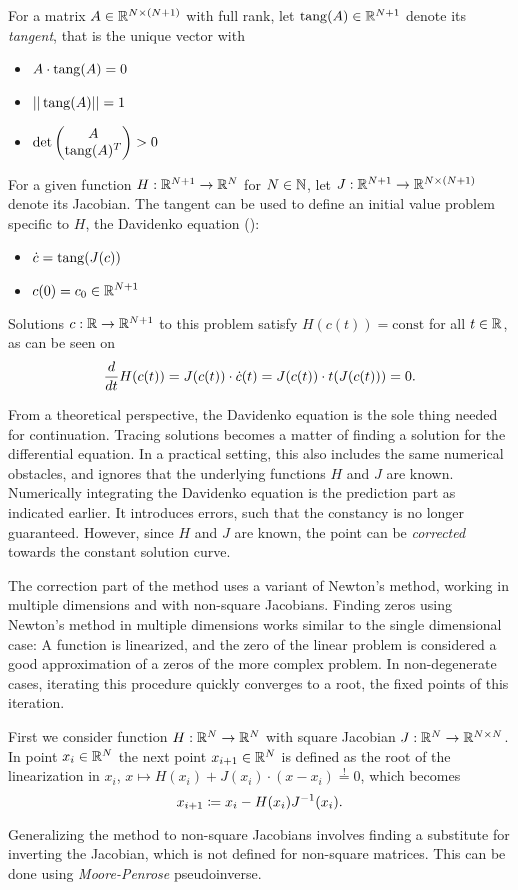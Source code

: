 For a matrix $A \in \mathbb{R}^{N \times (N+1)}$ with full rank, let $\operatorname{tang}(A) \in \mathbb{R}^{N+1}$ denote its \emph{tangent}, that is the unique vector with
	\begin{itemize}
		\item $\displaystyle A \cdot \operatorname{tang}(A) = 0$
		\item $\displaystyle ||\operatorname{tang}(A)|| = 1$
		\item $\displaystyle \det \begin{pmatrix}
			A\\
			\operatorname{tang}(A)^T
		\end{pmatrix} > 0$
	\end{itemize}
For a given function $H: \mathbb{R}^{N+1} \to \mathbb{R}^N$ for $N \in \mathbb{N}$, let $J: \mathbb{R}^{N+1} \to \mathbb{R}^{N \times (N+1)}$ denote its Jacobian.
The tangent can be used to define an initial value problem specific to $H$, the Davidenko equation (\cite{davidenko1953new}): %
	\begin{itemize}
		\item $\displaystyle \dot c = \operatorname{tang}(J(c))$ %
		\item $\displaystyle c(0) = c_0 \in \mathbb{R}^{N+1}$
	\end{itemize}
Solutions $c: \mathbb{R} \to \mathbb{R}^{N+1}$ to this problem satisfy $H(c(t)) = \text{const}$ for all $t \in \mathbb{R}$, as can be seen on
	\[
		\frac{d}{dt} H(c(t)) = J(c(t)) \cdot \dot c(t) = J(c(t)) \cdot t(J(c(t))) = 0 \text.
	\]

From a theoretical perspective, the Davidenko equation is the sole thing needed for continuation.
Tracing solutions becomes a matter of finding a solution for the differential equation.
In a practical setting, this also includes the same numerical obstacles, and ignores that the underlying functions $H$ and $J$ are known.
Numerically integrating the Davidenko equation is the prediction part as indicated earlier.
It introduces errors, such that the constancy is no longer guaranteed.
However, since $H$ and $J$ are known, the point can be \emph{corrected} towards the constant solution curve.

The correction part of the method uses a variant of Newton's method, working in multiple dimensions and with non-square Jacobians.
Finding zeros using Newton's method in multiple dimensions works similar to the single dimensional case: A function is linearized, and the zero of the linear problem is considered a good approximation of a zeros of the more complex problem.
In non-degenerate cases, iterating this procedure quickly converges to a root, the fixed points of this iteration.

First we consider function $H: \mathbb{R}^N \to \mathbb{R}^N$ with square Jacobian $J: \mathbb{R}^N \to \mathbb{R}^{N \times N}$.
In point $x_i \in \mathbb{R}^N$ the next point $x_{i+1} \in \mathbb{R}^N$ is defined as the root of the linearization in $x_i$, $x \mapsto H(x_i) + J(x_i) \cdot (x - x_i) \stackrel!= 0$, which becomes
	\[
		x_{i+1} \coloneqq x_i - H(x_i) J^{-1}(x_i) \text.
	\]

Generalizing the method to non-square Jacobians involves finding a substitute for inverting the Jacobian, which is not defined for non-square matrices.
This can be done using \emph{Moore-Penrose} pseudoinverse.



